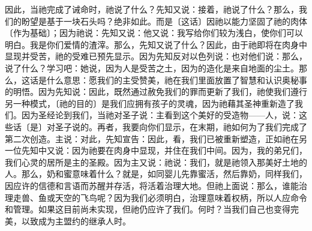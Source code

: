 因此，当祂完成了诫命时，祂说了什么？先知又说：接着，祂说了什么？那么，我们的盼望是基于一块石头吗？绝非如此。而是〔这话〕因祂以能力坚固了祂的肉体〔作为基础〕；因为祂说：先知又说：他又说：我写给你们较为浅白，使你们可以明白。我是你们爱情的渣滓。那么，先知又说了什么？因此，由于祂即将在肉身中显现并受苦，祂的受难已预先显示。因为先知反对以色列说：也对他们说：那么，说了什么？学习吧：她说，因为人是受苦之土，因为的造化是来自地面的尘土。那么，这话是什么意思：愿我们的主受赞美，祂在我们里面放置了智慧和认识奥秘事的明悟。因为先知说：因此，既然通过赦免我们的罪而更新了我们，祂使我们遵行另一种模式，〔祂的目的〕是我们应拥有孩子的灵魂，因为祂藉其圣神重新造了我们。因为圣经论到我们，当祂对圣子说：主看到这个美好的受造物——人，说：这些话〔是〕对圣子说的。再者，我要向你们显示，在末期，祂如何为了我们完成了第二次创造。主说：对此，先知宣告：因此，看，我们已被重新塑造，正如祂在另一位先知中又说：因为祂要在肉身中显现，并住在我们中间。因为，我的弟兄们，我们心灵的居所是主的圣殿。因为主又说：祂说：我们，就是祂领入那美好土地的人。那么，奶和蜜意味着什么？就是，如同婴儿先靠蜜活，然后靠奶，同样我们，因应许的信德和言语而苏醒并存活，将活着治理大地。但祂上面说：那么，谁能治理走兽、鱼或天空的飞鸟呢？因为我们必须明白，治理意味着权柄，所以人应命令和管理。如果这目前尚未实现，但祂仍应许了我们。何时？当我们自己也变得完美，以致成为主盟约的继承人时。\par

